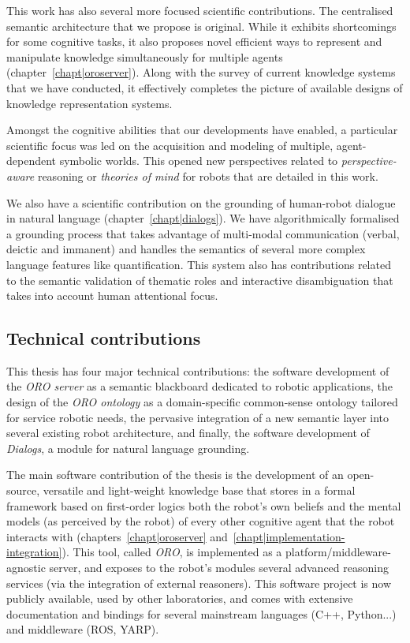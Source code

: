 This work has also several more focused scientific contributions. The
centralised semantic architecture that we propose is original. While it
exhibits shortcomings for some cognitive tasks, it also proposes novel
efficient ways to represent and manipulate knowledge simultaneously for
multiple agents (chapter~\ref{chapt|oroserver}). Along with the survey of
current knowledge systems that we have conducted, it effectively completes the
picture of available designs of knowledge representation systems.

Amongst the cognitive abilities that our developments have enabled, a
particular scientific focus was led on the acquisition and modeling of
multiple, agent-dependent symbolic worlds. This opened new perspectives related
to \emph{perspective-aware} reasoning or \emph{theories of mind} for robots
that are detailed in this work.

We also have a scientific contribution on the grounding of human-robot dialogue
in natural language (chapter~\ref{chapt|dialogs}). We have algorithmically
formalised a grounding process that takes advantage of multi-modal
communication (verbal, deictic and immanent) and handles the semantics of
several more complex language features like quantification. This system also
has contributions related to the semantic validation of thematic roles and
interactive disambiguation that takes into account human attentional focus.

\subsection{Technical contributions}
\label{sect|technical-contributions}


This thesis has four major technical contributions: the software development of
the \emph{ORO server} as a semantic blackboard dedicated to robotic
applications, the design of the \emph{ORO ontology} as a domain-specific
common-sense ontology tailored for service robotic needs, the pervasive
integration of a new semantic layer into several existing robot architecture,
and finally, the software development of \emph{Dialogs}, a module for natural
language grounding.

The main software contribution of the thesis is the development of an
open-source, versatile and light-weight knowledge base that stores in a formal
framework based on first-order logics both the robot's own beliefs and the
mental models (as perceived by the robot) of every other cognitive agent that
the robot interacts with (chapters~\ref{chapt|oroserver}
and~\ref{chapt|implementation-integration}).  This tool, called \emph{ORO}, is
implemented as a platform/middleware-agnostic server, and exposes to the
robot's modules several advanced reasoning services (via the integration of
external reasoners). This software project is now publicly available, used by
other laboratories, and comes with extensive documentation and bindings for
several mainstream languages (C++, Python...) and middleware (ROS, YARP).

